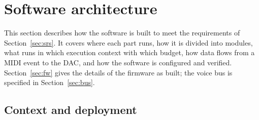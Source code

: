 
\section{Software architecture}\label{sec:sad}

This section describes how the software is built to meet the requirements of Section~\ref{sec:srs}. It covers where
each part runs, how it is divided into modules, what runs in which execution context with which budget, how data flows
from a MIDI event to the DAC, and how the software is configured and verified. Section~\ref{sec:fw} gives the
details of the firmware as built; the voice bus is specified in Section~\ref{sec:bus}.


\subsection{Context and deployment}

